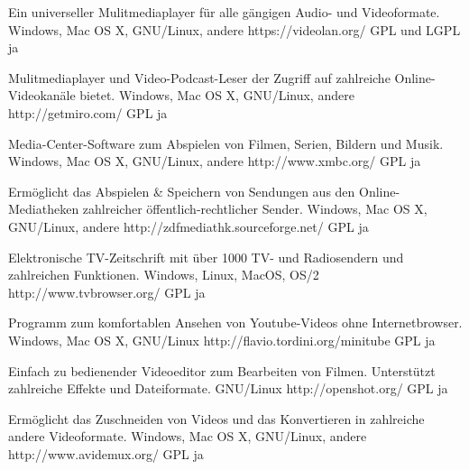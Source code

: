 \documentclass[11pt,a4paper,landscape,twocolumn]{article}
\begin{document}


{Ein universeller Mulitmediaplayer für alle gängigen Audio- und Videoformate.}
{Windows, Mac OS X, GNU/Linux, andere}
{https://videolan.org/}
{GPL und LGPL}
{ja}

{Mulitmediaplayer und Video-Podcast-Leser der Zugriff auf zahlreiche Online-Videokanäle bietet.}
{Windows, Mac OS X, GNU/Linux, andere}
{http://getmiro.com/}
{GPL}
{ja}

{Media-Center-Software zum Abspielen von Filmen, Serien, Bildern und Musik.}
{Windows, Mac OS X, GNU/Linux, andere}
{http://www.xmbc.org/}
{GPL}
{ja}

{Ermöglicht das Abspielen \& Speichern von Sendungen aus den Online-Mediatheken zahlreicher öffentlich-rechtlicher Sender.}
{Windows, Mac OS X, GNU/Linux, andere}
{http://zdfmediathk.sourceforge.net/}
{GPL}
{ja}


\newpage %


{Elektronische TV-Zeitschrift mit über 1000 TV- und Radiosendern und zahlreichen Funktionen.}
{Windows, Linux, MacOS, OS/2}
{http://www.tvbrowser.org/}
{GPL}
{ja}

{Programm zum komfortablen Ansehen von Youtube-Videos ohne Internetbrowser.}
{Windows, Mac OS X, GNU/Linux}
{http://flavio.tordini.org/minitube}
{GPL}
{ja}

{Einfach zu bedienender Videoeditor zum Bearbeiten von Filmen. Unterstützt zahlreiche Effekte und Dateiformate.}
{GNU/Linux}
{http://openshot.org/}
{GPL}
{ja}

{Ermöglicht das Zuschneiden von Videos und das Konvertieren in zahlreiche andere Videoformate.}
{Windows, Mac OS X, GNU/Linux, andere}
{http://www.avidemux.org/}
{GPL}
{ja}
\end{document}

